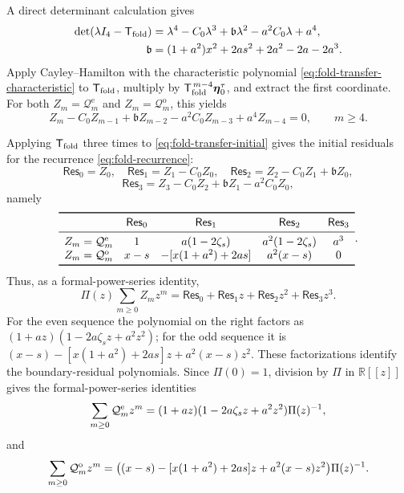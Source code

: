 \documentclass[10pt,twoside]{siamart1116}
\numberwithin{equation}{section}
\begin{document}
A direct determinant calculation gives
\begin{equation}\label{eq:fold-transfer-characteristic}
\begin{aligned}
 \det(\lambda I_4-\mathsf T_{\rm fold})
 &=
 \lambda^4-C_0\lambda^3+\mathfrak b\lambda^2
 -a^2C_0\lambda+a^4,\\
 \mathfrak b
 &=(1+a^2)x^2+2as^2+2a^2-2a-2a^3.
\end{aligned}
\end{equation}
Apply Cayley--Hamilton with the characteristic polynomial
\eqref{eq:fold-transfer-characteristic} to \(\mathsf T_{\rm fold}\), multiply by
\(\mathsf T_{\rm fold}^{\,m-4}\boldsymbol\eta_0^\tau\), and extract the
first coordinate.  For both \(Z_m=\mathcal Q_m^{\mathrm e}\) and
\(Z_m=\mathcal Q_m^{\mathrm o}\), this yields
\begin{equation}\label{eq:fold-recurrence}
 Z_m-C_0Z_{m-1}+\mathfrak bZ_{m-2}
 -a^2C_0Z_{m-3}+a^4Z_{m-4}=0,
 \qquad m\geq4.
\end{equation}

Applying \(\mathsf T_{\rm fold}\) three times to
\eqref{eq:fold-transfer-initial} gives the initial residuals for the
recurrence \eqref{eq:fold-recurrence}:
\[
 \mathsf{Res}_0=Z_0,\quad
 \mathsf{Res}_1=Z_1-C_0Z_0,\quad
 \mathsf{Res}_2=Z_2-C_0Z_1+\mathfrak bZ_0,
\]
\[
 \mathsf{Res}_3
 =Z_3-C_0Z_2+\mathfrak bZ_1-a^2C_0Z_0,
\]
namely
\[
\begin{array}{ccccc}
 \toprule
 &\mathsf{Res}_0&\mathsf{Res}_1&\mathsf{Res}_2&\mathsf{Res}_3\\ \midrule
 Z_m=\mathcal Q_m^{\rm e}
 &1&a(1-2\zeta_s)&a^2(1-2\zeta_s)&a^3\\
 Z_m=\mathcal Q_m^{\rm o}
 &x-s&-[x(1+a^2)+2as]&a^2(x-s)&0\\
 \bottomrule
\end{array}.
\]
Thus, as a formal-power-series identity,
\[
 \Pi(z)\sum_{m\geq0}Z_mz^m
 =\mathsf{Res}_0+\mathsf{Res}_1z+\mathsf{Res}_2z^2+\mathsf{Res}_3z^3.
\]
For the even sequence the polynomial on the right factors as
\((1+az)(1-2a\zeta_sz+a^2z^2)\); for the odd sequence it is
\((x-s)-[x(1+a^2)+2as]z+a^2(x-s)z^2\).  These factorizations identify the
boundary-residual polynomials.  Since \(\Pi(0)=1\), division by \(\Pi\) in
\(\mathbb R[[z]]\) gives the formal-power-series identities
\begin{equation}\label{eq:fold-generating-even}
 \sum_{m\geq0}\mathcal Q_m^{\rm e}z^m
 =(1+az)(1-2a\zeta_sz+a^2z^2)\Pi(z)^{-1},
\end{equation}
and
\begin{equation}\label{eq:fold-generating-odd}
 \sum_{m\geq0}\mathcal Q_m^{\rm o}z^m
 =\bigl((x-s)-[x(1+a^2)+2as]z+a^2(x-s)z^2\bigr)
  \Pi(z)^{-1}.
\end{equation}
\end{document}
